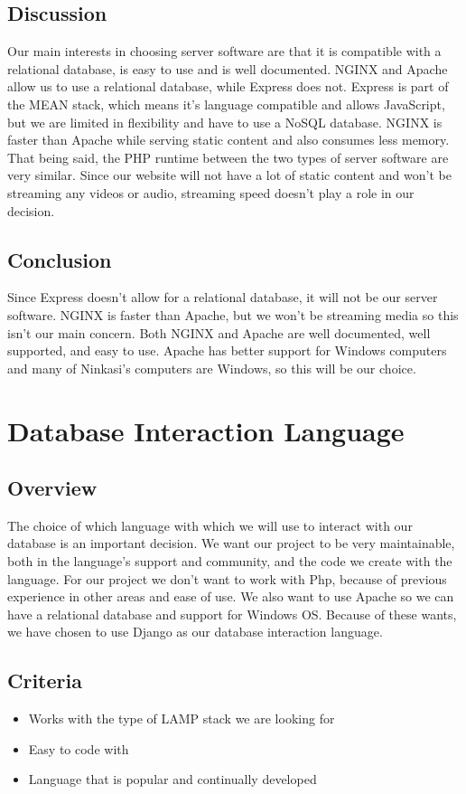 \documentclass[draftclsnofoot,onecolumn,letterpaper,10pt,compsoc]{IEEEtran}
\begin{document}
				\subsection{Discussion}
				Our main interests in choosing server software are that it is compatible with a relational database, is easy to use and is well documented.
				NGINX and Apache allow us to use a relational database, while Express does not.
				Express is part of the MEAN stack, which means it’s language compatible and allows JavaScript, but we are limited in flexibility and have to use a NoSQL database.
				NGINX is faster than Apache while serving static content and also consumes less memory. That being said, the PHP runtime between the two types of server software are very similar\cite{HostingAd}.
				Since our website will not have a lot of static content and won’t be streaming any videos or audio, streaming speed doesn’t play a role in our decision.
				\subsection{Conclusion}
				Since Express doesn’t allow for a relational database, it will not be our server software.
				NGINX is faster than Apache, but we won’t be streaming media so this isn’t our main concern.
				Both NGINX and Apache are well documented, well supported, and easy to use.
				Apache has better support for Windows computers and many of Ninkasi’s computers are Windows, so this will be our choice.

		\section{Database Interaction Language}
		\subsection{Overview}
			The choice of which language with which we will use to interact with our database is an important decision.
			We want our project to be very maintainable, both in the language's support and community, and the code we create with the language.
			For our project we don’t want to work with Php, because of previous experience in other areas and ease of use.
			We also want to use Apache so we can have a relational database and support for Windows OS.
			Because of these wants, we have chosen to use Django as our database interaction language.
			\subsection{Criteria}
			\begin{itemize}
			\item Works with the type of LAMP stack we are looking for
			\item Easy to code with
			\item Language that is popular and continually developed
			\end{itemize}
\end{document}
